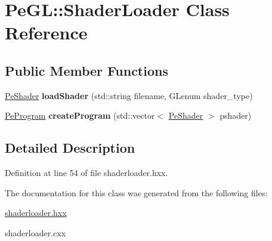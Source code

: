 \hypertarget{classPeGL_1_1ShaderLoader}{\section{Pe\-G\-L\-:\-:Shader\-Loader Class Reference}
\label{classPeGL_1_1ShaderLoader}
}
\subsection*{Public Member Functions}
\begin{DoxyCompactItemize}
\item 
\hypertarget{classPeGL_1_1ShaderLoader_a74c1e46b5637ef5a22544cee5947201f}{\hyperlink{structPeGL_1_1PeShader}{Pe\-Shader} {\bfseries load\-Shader} (std\-::string filename, G\-Lenum shader\-\_\-type)}\label{classPeGL_1_1ShaderLoader_a74c1e46b5637ef5a22544cee5947201f}

\item 
\hypertarget{classPeGL_1_1ShaderLoader_a0570f0dd3e3e87a5016b41684b54bd0a}{\hyperlink{structPeGL_1_1PeProgram}{Pe\-Program} {\bfseries create\-Program} (std\-::vector$<$ \hyperlink{structPeGL_1_1PeShader}{Pe\-Shader} $>$ pshader)}\label{classPeGL_1_1ShaderLoader_a0570f0dd3e3e87a5016b41684b54bd0a}

\end{DoxyCompactItemize}


\subsection{Detailed Description}


Definition at line 54 of file shaderloader.\-hxx.



The documentation for this class was generated from the following files\-:\begin{DoxyCompactItemize}
\item 
\hyperlink{shaderloader_8hxx}{shaderloader.\-hxx}\item 
shaderloader.\-cxx\end{DoxyCompactItemize}

